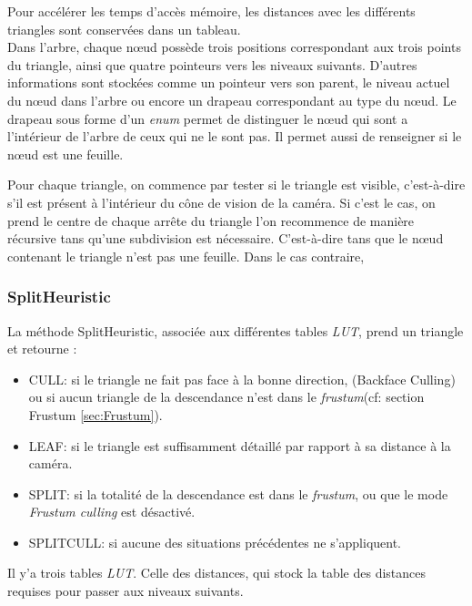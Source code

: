 	Pour accélérer les temps d'accès mémoire, les distances avec les différents triangles sont conservées
	dans un tableau. \\

	Dans l'arbre, chaque n\oe{}ud possède trois positions correspondant aux trois points du triangle,
	ainsi que quatre pointeurs vers les niveaux suivants.
	D'autres informations sont stockées comme un pointeur vers son parent, le niveau actuel du
	n\oe{}ud dans l'arbre ou encore un drapeau correspondant au type du n\oe{}ud.
	Le drapeau sous forme d'un \emph{enum} permet de distinguer le n\oe{}ud qui sont a l'intérieur de l'arbre de ceux
	qui ne le sont pas. Il permet aussi de renseigner si le n\oe{}ud est une feuille.
		
	Pour chaque triangle, on commence par tester si le triangle est visible, c'est-à-dire s'il est
	présent à l'intérieur du cône de vision de la caméra. Si c'est le cas, on prend le centre de chaque
	arrête du triangle l'on recommence de manière récursive tans qu'une subdivision est nécessaire.
	C'est-à-dire tans que le n\oe{}ud contenant le triangle n'est pas une feuille. Dans le cas contraire,
	\fi	
	
	\subsubsection{SplitHeuristic}
	\label{sec:SplitHeuristic}
	La méthode SplitHeuristic, associée aux différentes tables \textit{LUT}, prend un triangle et retourne :
	\begin{itemize} 
	\item CULL: 
	 \newline si le triangle ne fait pas face à la bonne direction, (Backface Culling) ou si aucun triangle de la descendance n'est dans le \textit{frustum}(cf: section Frustum \ref{sec:Frustum}).
	\item LEAF: 
	\newline si le triangle est suffisamment détaillé par rapport à sa distance à la caméra.
	\item SPLIT: 
	\newline si la totalité de la descendance est dans le \textit{frustum}, ou que le mode \textit{Frustum culling} est désactivé.
	\item SPLITCULL:
	\newline si aucune des situations précédentes ne s'appliquent.
	\end{itemize}
	
	Il y'a trois tables \textit{LUT}. 
	Celle des distances, qui stock la table des distances requises pour passer aux niveaux suivants. 
	
